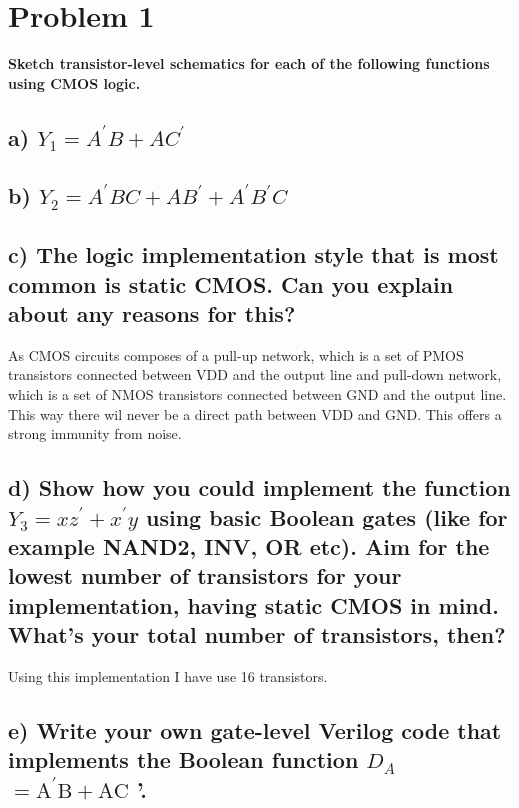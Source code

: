 \section{Problem 1}

\textbf{Sketch transistor-level schematics for each of the following functions using CMOS logic.}
\subsection*{a) $Y_1=A^{\prime} B+A C^{\prime}$}

\subsection*{b) $Y_2=A^{\prime} B C+A B^{\prime}+A^{\prime} B^{\prime} C$}

\subsection*{c) The logic implementation style that is most common is static CMOS. Can you explain about any reasons for this?}

As CMOS circuits composes of a pull-up network, which is a set of PMOS transistors connected between VDD and the output line and pull-down network, which is a set of NMOS transistors connected between GND and the output line. This way there wil never be a direct path between VDD and GND. This offers a strong immunity from noise.

\subsection*{d) Show how you could implement the function $Y_3=x z^{\prime}+x^{\prime} y$ using basic Boolean gates (like for example NAND2, INV, OR etc). Aim for the lowest number of transistors for your implementation, having static CMOS in mind. What's your total number of transistors, then?}
Using this implementation I have use 16 transistors.
\pagebreak
\subsection*{e) Write your own gate-level Verilog code that implements the Boolean function $D_A$ $=\mathrm{A}^{\prime} \mathrm{B}+\mathrm{AC}$ '.}


